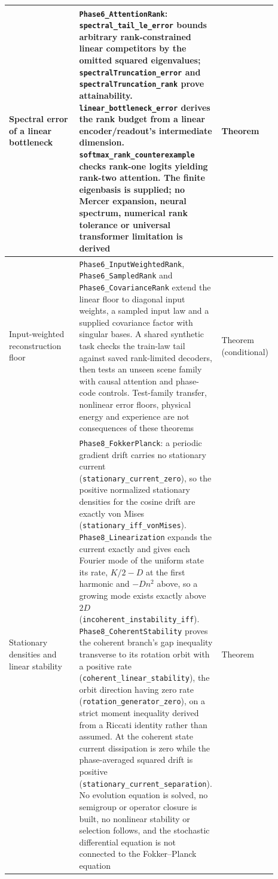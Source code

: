 \documentclass{article}
\begin{document}
\begin{longtable}{|>{\raggedright\arraybackslash}p{0.26\linewidth}|>{\raggedright\arraybackslash}p{0.46\linewidth}|>{\raggedright\arraybackslash}p{0.17\linewidth}|}
Spectral error of a linear bottleneck & \nolinkurl{Phase6_AttentionRank}: \nolinkurl{spectral_tail_le_error} bounds arbitrary rank-constrained linear competitors by the omitted squared eigenvalues; \nolinkurl{spectralTruncation_error} and \nolinkurl{spectralTruncation_rank} prove attainability. \nolinkurl{linear_bottleneck_error} derives the rank budget from a linear encoder/readout's intermediate dimension. \nolinkurl{softmax_rank_counterexample} checks rank-one logits yielding rank-two attention. The finite eigenbasis is supplied; no Mercer expansion, neural spectrum, numerical rank tolerance or universal transformer limitation is derived & Theorem \\ \hline
Input-weighted reconstruction floor & \nolinkurl{Phase6_InputWeightedRank}, \nolinkurl{Phase6_SampledRank} and \nolinkurl{Phase6_CovarianceRank} extend the linear floor to diagonal input weights, a sampled input law and a supplied covariance factor with singular bases. A shared synthetic task checks the train-law tail against saved rank-limited decoders, then tests an unseen scene family with causal attention and phase-code controls. Test-family transfer, nonlinear error floors, physical energy and experience are not consequences of these theorems & Theorem (conditional) \\ \hline
Stationary densities and linear stability & \nolinkurl{Phase8_FokkerPlanck}: a periodic gradient drift carries no stationary current (\nolinkurl{stationary_current_zero}), so the positive normalized stationary densities for the cosine drift are exactly von Mises (\nolinkurl{stationary_iff_vonMises}). \nolinkurl{Phase8_Linearization} expands the current exactly and gives each Fourier mode of the uniform state its rate, $K/2-D$ at the first harmonic and $-Dn^2$ above, so a growing mode exists exactly above $2D$ (\nolinkurl{incoherent_instability_iff}). \nolinkurl{Phase8_CoherentStability} proves the coherent branch's gap inequality transverse to its rotation orbit with a positive rate (\nolinkurl{coherent_linear_stability}), the orbit direction having zero rate (\nolinkurl{rotation_generator_zero}), on a strict moment inequality derived from a Riccati identity rather than assumed. At the coherent state current dissipation is zero while the phase-averaged squared drift is positive (\nolinkurl{stationary_current_separation}). No evolution equation is solved, no semigroup or operator closure is built, no nonlinear stability or selection follows, and the stochastic differential equation is not connected to the Fokker--Planck equation & Theorem \\ \hline

\end{longtable}
\end{document}
